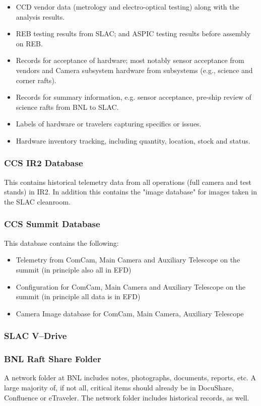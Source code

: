 \begin{itemize}
\begin{itemize}
			\item CCD vendor data (metrology and electro-optical testing) along with the analysis results.
			\item REB testing results from SLAC; and ASPIC testing results before assembly on REB.
			\item Records for acceptance of hardware; most notably sensor acceptance from vendors and Camera subsystem hardware from subsystems (e.g., science and corner rafts).
			\item Records for summary information, e.g. sensor acceptance, pre-ship review of science rafts from BNL to SLAC.
			\item Labels of hardware or travelers capturing specifics or issues.
			\item Hardware inventory tracking, including quantity, location, stock and status.
		\end{itemize}
	\end{itemize}
	\subsubsection{CCS IR2 Database}
	This contains historical telemetry data from all operations (full camera and test stands) in IR2. In addition this contains the "image database" for images taken in the SLAC cleanroom.
	\subsubsection{CCS Summit Database}
	This database contains the following:
	\begin{itemize}
		\item Telemetry from ComCam, Main Camera and Auxiliary Telescope on the summit (in principle also all in EFD)
		\item Configuration for ComCam, Main Camera and Auxiliary Telescope on the summit (in principle all data is in EFD)
		\item Camera Image database for ComCam, Main Camera, Auxiliary Telescope
	\end{itemize}

	\subsubsection{SLAC V--Drive}

	\subsubsection{BNL Raft Share Folder}
	A network folder at BNL includes notes, photographs, documents, reports, etc. A large majority of, if not all, critical items should already be in DocuShare, Confluence or eTraveler. The network folder includes historical records, as well.

